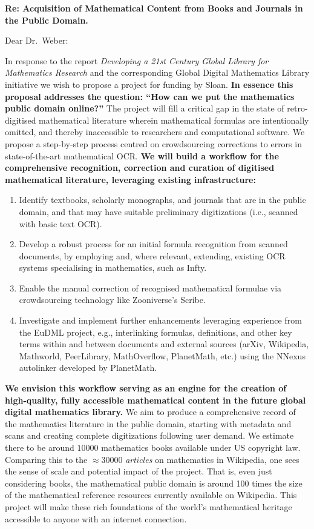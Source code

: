 \documentclass[10pt,letterpaper]{article}
\begin{document}
\thispagestyle{empty}

\noindent\textbf{Re: \quad Acquisition of Mathematical Content from Books and Journals in the Public Domain.}

\bigskip

\noindent Dear Dr.~Weber:

\bigskip

In response to the report \emph{Developing a 21st Century Global
  Library for Mathematics Research} and the corresponding Global
Digital Mathematics Library initiative we wish to propose a project
for funding by Sloan.  \textbf{In essence this proposal addresses the
  question: ``How can we put the mathematics public domain online?''}
The project will fill a critical gap in the state of retro-digitised
mathematical literature wherein mathematical formulas are
intentionally omitted, and thereby inaccessible to researchers and
computational software.  We propose a step-by-step process centred on
crowdsourcing corrections to errors in state-of-the-art mathematical
OCR.  \textbf{We will build a workflow for the comprehensive
  recognition, correction and curation of digitised mathematical
  literature, leveraging existing infrastructure:}
\begin{enumerate}
\item Identify textbooks, scholarly monographs, and journals that are
  in the public domain, and that may have suitable preliminary
  digitizations (i.e., scanned with basic text OCR).
\item Develop a robust process for an initial formula recognition from scanned 
documents, by employing and, where relevant, extending, existing OCR systems 
specialising in mathematics, such as {\sf Infty}.
\item Enable 
the manual correction of recognised mathematical formulae via crowdsourcing 
technology like Zooniverse's {\sf Scribe}.
\item Investigate and implement further enhancements leveraging
  experience from the EuDML project, e.g., interlinking formulas,
  definitions, and other key terms within and between documents and
  external sources (arXiv, Wikipedia, Mathworld, PeerLibrary,
  MathOverflow, PlanetMath, etc.) using the {\sf NNexus} autolinker
  developed by PlanetMath.
\end{enumerate}
\textbf{We envision this workflow serving as an engine for the
  creation of high-quality, fully accessible mathematical content in
  the future global digital mathematics library.}  We aim to produce a
comprehensive record of the mathematics literature in the public
domain, starting with metadata and scans and creating complete
digitizations following user demand.  We estimate there to be around
$10000$ mathematics books available under US copyright law.  Comparing
this to the $\approx$30000 \emph{articles} on mathematics in
Wikipedia, one sees the sense of scale and potential impact of the
project.  That is, even just considering books, the mathematical
public domain is around 100 times the size of the mathematical
reference resources currently available on Wikipedia.  This project
will make these rich foundations of the world's mathematical heritage
accessible to anyone with an internet connection.
\end{document}
